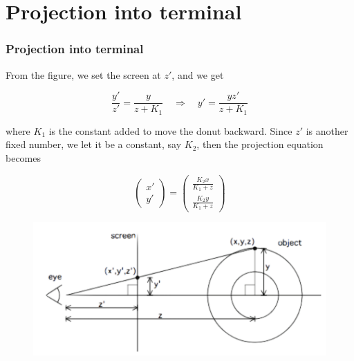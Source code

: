 \documentclass[12pt, t]{beamer}
\begin{document}

\section{Projection into terminal}
\begin{frame}
    \frametitle{Projection into terminal}

    From the figure, we set the screen at $z'$, and we get

    \begin{equation*}
            \frac{y'}{z'} = \frac{y}{z + K_1} \quad \Rightarrow \quad y' = \frac{yz'}{z + K_1}
    \end{equation*}

    where $K_1$ is the constant added to move the donut backward. Since $z'$ is another fixed number,
    we let it be a constant, say $K_2$, then the projection equation becomes

    \begin{equation*}
        \begin{pmatrix}
            x'  \\[0.5em]
            y'
        \end{pmatrix}
        =
        \begin{pmatrix}
            \frac{K_2 x}{K_1 + z} \\[0.5em]
            \frac{K_2 y}{K_1 + z}
        \end{pmatrix}
    \end{equation*}

    \begin{figure}[H]
        \centering
        \includegraphics[width=0.5\linewidth]{Figures/projection.png}
        \label{fig1}
    \end{figure}

\end{frame}

\end{document}
